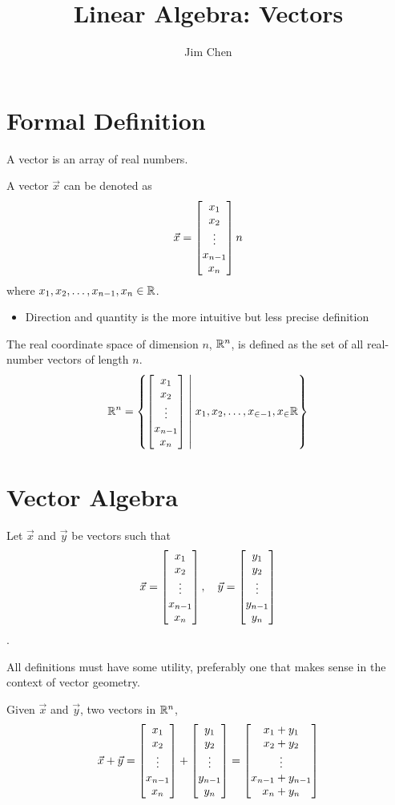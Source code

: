 \documentclass{mlatext}
\title{Linear Algebra: Vectors}
\author{Jim Chen}
\begin{document}
\maketitlepage

\section{Formal Definition}
\begin{defn}[Vector]
  A vector is an array of real numbers.

  A vector $\vec{x}$ can be denoted as
  \begin{equation*}
    \vec{x} = \begin{bmatrix} x_1\\x_2\\\vdots\\x_{n - 1}\\x_n \end{bmatrix}{n}
  \end{equation*}
  where $x_1, x_2, \ldots, x_{n - 1}, x_{n} \in \mathbb{R}$.
\end{defn}
\begin{itemize}
\item Direction and quantity is the more intuitive but less precise definition
\end{itemize}
\begin{defn}
  The real coordinate space of dimension $n$, $\mathbb{R}^n$, is defined as the set of all real-number vectors of length $n$.
  \begin{equation*}
    \mathbb{R}^n = \left\{ \begin{bmatrix} x_1\\x_2\\\vdots\\x_{n - 1}\\x_n \end{bmatrix} \;\middle|\; x_1, x_2, \ldots, x_{\in - 1}, x_{\in} \mathbb{R} \right\}
  \end{equation*}
\end{defn}

\section{Vector Algebra}
Let $\vec{x}$ and $\vec{y}$ be vectors such that
\begin{equation*}
\vec{x} = \begin{bmatrix} x_1\\x_2\\\vdots\\x_{n - 1}\\x_n \end{bmatrix},\quad
\vec{y} = \begin{bmatrix} y_1\\y_2\\\vdots\\y_{n - 1}\\y_n \end{bmatrix}
\end{equation*}.

All definitions must have some utility, preferably one that makes sense in the context of vector geometry.

\begin{defn}[Addition]
  Given $\vec{x}$ and $\vec{y}$, two vectors in $\mathbb{R}^n$,
  \begin{equation*}
    \vec{x} + \vec{y} = \begin{bmatrix} x_1\\x_2\\\vdots\\x_{n - 1}\\x_n \end{bmatrix} + \begin{bmatrix} y_1\\y_2\\\vdots\\y_{n - 1}\\y_n \end{bmatrix} = \begin{bmatrix} x_1 + y_1\\x_2 + y_2\\\vdots\\x_{n-1} + y_{n-1}\\x_n + y_n \end{bmatrix}
  \end{equation*}
\end{defn}
\end{document}
